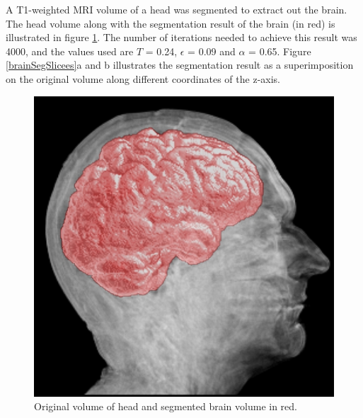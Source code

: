 A T1-weighted MRI volume of a head was segmented to extract out the brain. The head volume along with the segmentation result of the brain (in red) is illustrated in figure \ref{brainT14000itst024e009a065}. The number of iterations needed to achieve this result was 4000, and the values used are $T$ = 0.24, $\epsilon$ = 0.09 and $\alpha$ = 0.65. Figure \ref{brainSegSlicees}a and b illustrates the segmentation result as a superimposition on the original volume along different coordinates of the z-axis.
\begin{figure}[h!]
\centering
\includegraphics[width=.9\textwidth]{results/3D/brainT1_4000_its_t024e009a065}
\caption{Original volume of head and segmented brain volume in red.}
\label{brainT14000itst024e009a065}
\end{figure}

